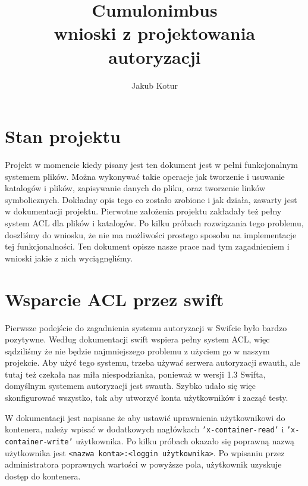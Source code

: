 

\usepackage{microtype}


\title{Cumulonimbus\\\large{wnioski z projektowania autoryzacji}}
\author{Jakub Kotur}


	\maketitle

	\section{Stan projektu}\label{sec:stan projektu}

	Projekt w momencie kiedy pisany jest ten dokument jest w pełni funkcjonalnym systemem plików. Można wykonywać takie operacje jak tworzenie i usuwanie katalogów i plików, zapisywanie danych do pliku, oraz tworzenie linków symbolicznych. Dokładny opis tego co zostało zrobione i jak działa, zawarty jest w dokumentacji projektu. Pierwotne założenia projektu zakładały też pełny system ACL dla plików i katalogów. Po kilku próbach rozwiązania tego problemu, doszliśmy do wniosku, że nie ma możliwości prostego sposobu na implementacje tej funkcjonalności. Ten dokument opisze nasze prace nad tym zagadnieniem i wnioski jakie z nich wyciągnęliśmy.
	
	\section{Wsparcie ACL przez swift}\label{sec:wsparcie acl przez swift}

	Pierwsze podejście do zagadnienia systemu autoryzacji w Swifcie było bardzo pozytywne. Według dokumentacji swift wspiera pełny system ACL, więc sądziliśmy że nie będzie najmniejszego problemu z użyciem go w naszym projekcie. Aby użyć tego systemu, trzeba używać serwera autoryzacji swauth, ale tutaj też czekała nas miła niespodzianka, ponieważ w wersji 1.3 Swifta, domyślnym systemem autoryzacji jest swauth. Szybko udało się więc skonfigurować wszystko, tak aby utworzyć konta użytkowników i zacząć testy.

	W dokumentacji jest napisane że aby ustawić uprawnienia użytkownikowi do kontenera, należy wpisać w dodatkowych nagłówkach \texttt{'x-container-read'} i \texttt{'x-container-write'} użytkownika. Po kilku próbach okazało się poprawną nazwą użytkownika jest \texttt{<nazwa konta>:<loggin użytkownika>}. Po wpisaniu przez administratora poprawnych wartości w powyższe pola, użytkownik uzyskuje dostęp do kontenera.

